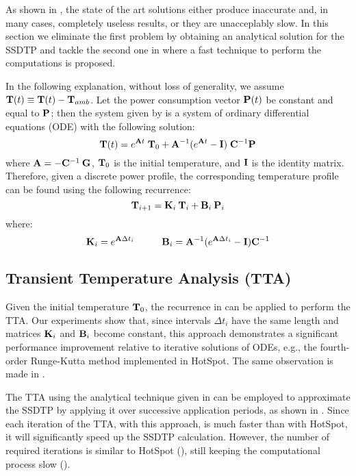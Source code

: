 As shown in , the state of the art solutions either produce inaccurate and, in many cases, completely useless results, or they are unacceplably slow. In this section we eliminate the first problem by obtaining an analytical solution for the SSDTP and tackle the second one in  where a fast technique to perform the computations is proposed.

In the following explanation, without loss of generality, we assume $\mathbf{T}(t) \equiv \mathbf{T}(t) - \mathbf{T}_{amb}$. Let the power consumption vector $\mathbf{P}(t)$ be constant and equal to $\mathbf{P}$; then the system given by  is a system of ordinary differential equations (ODE) with the following solution:
\begin{equation} \label{eq:solution}
  \mathbf{T}(t) = e^{\mathbf{A} t} \; \mathbf{T}_0 + \mathbf{A}^{-1} (e^{\mathbf{A} t} - \mathbf{I}) \; \mathbf{C}^{-1} \mathbf{P}
\end{equation}
where $\mathbf{A} = -\mathbf{C}^{-1} \: \mathbf{G}$, $\mathbf{T}_0$ is the initial temperature, and $\mathbf{I}$ is the identity matrix. Therefore, given a discrete power profile, the corresponding temperature profile can be found using the following recurrence:
\begin{equation} \label{eq:recurrent-system}
  \mathbf{T}_{i+1} = \mathbf{K}_i \: \mathbf{T}_i + \mathbf{B}_i \: \mathbf{P}_i
\end{equation}
where:
\[
  \m{K}_i = e^{\m{A} \Delta t_i} \hs \m{B}_i = \m{A}^{-1}(e^{\m{A} \Delta t_i} - \m{I})\m{C}^{-1}
\]

\subsection{Transient Temperature Analysis (TTA)} \label{sec:tta-analytical}
Given the initial temperature $\mathbf{T}_0$, the recurrence in  can be applied to perform the TTA. Our experiments show that, since intervals $\Delta t_i$ have the same length and matrices $\mathbf{K}_i$ and $\mathbf{B}_i$ become constant, this approach demonstrates a significant performance improvement relative to iterative solutions of ODEs, e.g., the fourth-order Runge-Kutta method implemented in HotSpot. The same observation is made in \cite{thiele2011}.

The TTA using the analytical technique given in  can be employed to approximate the SSDTP by applying it over successive application periods, as shown in . Since each iteration of the TTA, with this approach, is much faster than with HotSpot, it will significantly speed up the SSDTP calculation. However, the number of required iterations is similar to HotSpot (), still keeping the computational process slow ().

